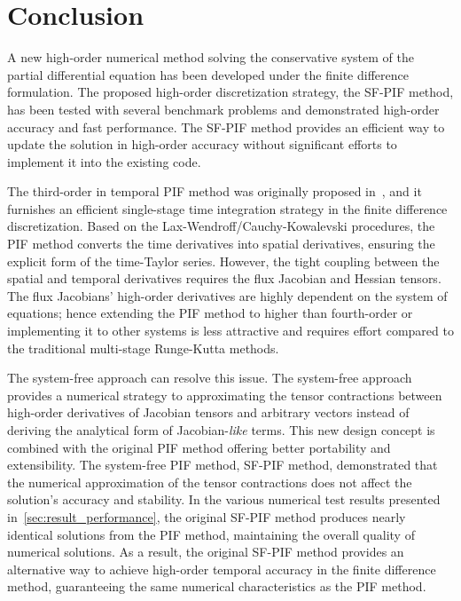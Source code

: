 \chapter{Conclusion}\label{ch:conclusion}

A new high-order numerical method solving the conservative system of
the partial differential equation has been developed under the finite difference formulation.
The proposed high-order discretization strategy, the SF-PIF method,
has been tested with several benchmark problems
and demonstrated high-order accuracy and fast performance.
The SF-PIF method provides an efficient way to update the solution
in high-order accuracy without significant efforts to implement it into the existing code. 

The third-order in temporal PIF method was originally proposed in~\cite{seal2016explicit},
and it furnishes an efficient single-stage time integration strategy in the finite difference discretization.
Based on the Lax-Wendroff/Cauchy-Kowalevski procedures, the PIF method converts
the time derivatives into spatial derivatives,
ensuring the explicit form of the time-Taylor series.
However, the tight coupling between the spatial and temporal derivatives
requires the flux Jacobian and Hessian tensors.
The flux Jacobians' high-order derivatives are highly dependent on the system of equations;
hence extending the PIF method to higher than fourth-order or implementing it to other systems
is less attractive and requires effort compared to the traditional multi-stage Runge-Kutta methods.

The system-free approach can resolve this issue. The system-free approach provides
a numerical strategy to approximating the tensor contractions
between high-order derivatives of Jacobian tensors and arbitrary vectors
instead of deriving the analytical form of Jacobian-\textit{like} terms.
This new design concept is combined with the original PIF method offering
better portability and extensibility.
The system-free PIF method, SF-PIF method, demonstrated that the numerical approximation
of the tensor contractions does not affect the solution's accuracy and stability.
In the various numerical test results presented in~\cref{sec:result_performance},
the original SF-PIF method produces nearly identical solutions from the PIF method,
maintaining the overall quality of numerical solutions.
As a result, the original SF-PIF method provides an alternative way
to achieve high-order temporal accuracy in the finite difference method,
guaranteeing the same numerical characteristics as the PIF method.

